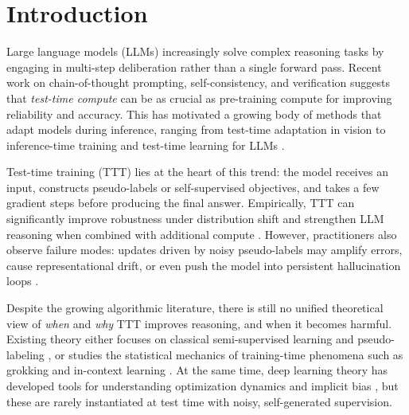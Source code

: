 \documentclass{article}
\theoremstyle{plain}
\theoremstyle{definition}
\theoremstyle{remark}
\begin{document}
\section{Introduction}
\label{sec:intro}

Large language models (LLMs) increasingly solve complex reasoning tasks by engaging in multi-step deliberation rather than a single forward pass. Recent work on chain-of-thought prompting, self-consistency, and verification \cite{selfconsistency2022,zelikman2024star,lightman2024let} suggests that \emph{test-time compute} can be as crucial as pre-training compute for improving reliability and accuracy. This has motivated a growing body of methods that adapt models during inference, ranging from test-time adaptation in vision \cite{sun2020ttt,wang2021tent,zhang2024surveytta,xiao2024beyond} to inference-time training and test-time learning for LLMs \cite{templora2024,tlm2025,inplacettt2025,llmttt2024mm,xie2025memoryttt}.

Test-time training (TTT) lies at the heart of this trend: the model receives an input, constructs pseudo-labels or self-supervised objectives, and takes a few gradient steps before producing the final answer. Empirically, TTT can significantly improve robustness under distribution shift \cite{sun2020ttt,sun2023learning,wang2023otta,lact2025,owttt2025} and strengthen LLM reasoning when combined with additional compute \cite{snell2024scaling,ttcsurvey2025,ttcompute2025,deepseek2025}. However, practitioners also observe failure modes: updates driven by noisy pseudo-labels may amplify errors, cause representational drift, or even push the model into persistent hallucination loops \cite{wu2024representational,wei2024jailbreak,chen2024understanding,corepo2025}.

Despite the growing algorithmic literature, there is still no unified theoretical view of \emph{when} and \emph{why} TTT improves reasoning, and when it becomes harmful. Existing theory either focuses on classical semi-supervised learning and pseudo-labeling \cite{yaroslavsky2010selftraining,lee2013pseudolabel,chapelle2006ssl,grandvalet2005entropy,sohn2020fixmatch,zhai2019s4l,kumar2024consistency}, or studies the statistical mechanics of training-time phenomena such as grokking and in-context learning \cite{power2022grokking,bahri2024statmech,liu2024physics}. At the same time, deep learning theory has developed tools for understanding optimization dynamics and implicit bias \cite{hardt2016sgd,soudry2018implicit,borkar2000ode}, but these are rarely instantiated at test time with noisy, self-generated supervision.
\end{document}
